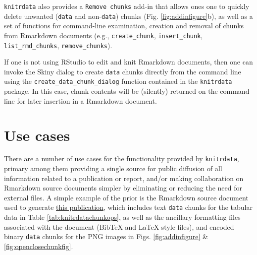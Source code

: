 \texttt{knitrdata} also provides a \texttt{Remove\ chunks} add-in that allows ones one to quickly delete unwanted (\texttt{data} and non-\texttt{data}) chunks (Fig. \ref{fig:addinfigure}b), as well as a set of functions for command-line examination, creation and removal of chunks from Rmarkdown documents (e.g., \texttt{create\_chunk}, \texttt{insert\_chunk}, \texttt{list\_rmd\_chunks}, \texttt{remove\_chunks}).

If one is not using RStudio to edit and knit Rmarkdown documents, then one can invoke the Skiny dialog to create \texttt{data} chunks directly from the command line using the \texttt{create\_data\_chunk\_dialog} function contained in the \texttt{knitrdata} package. In this case, chunk contents will be (silently) returned on the command line for later insertion in a Rmarkdown document.

\hypertarget{use-cases}{%
\section{Use cases}\label{use-cases}}

There are a number of use cases for the functionality provided by \texttt{knitrdata}, primary among them providing a single source for public diffusion of all information related to a publication or report, and/or making collaboration on Rmarkdown source documents simpler by eliminating or reducing the need for external files. A simple example of the prior is the Rmarkdown source document used to generate \href{https://github.com/dmkaplan2000/knitrdata_examples/blob/e5f59b7475a542bef41c60e8ee6652f656c9e377/2020-knitrdata.Rmd}{this publication}, which includes text \texttt{data} chunks for the tabular data in Table \ref{tab:knitrdatachunkops}, as well as the ancillary formatting files associated with the document (BibTeX and LaTeX style files), and encoded binary \texttt{data} chunks for the PNG images in Figs. \ref{fig:addinfigure} \& \ref{fig:openclosechunkfig}.

